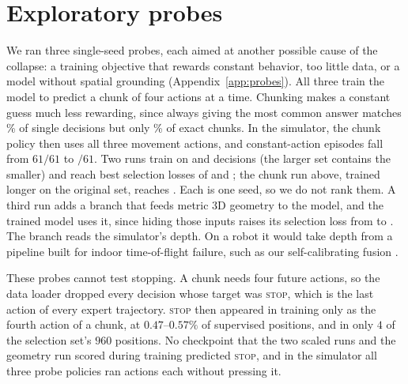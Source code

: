 \section{Exploratory probes}
\label{sec:probes}

We ran three single-seed probes, each aimed at another possible cause of the collapse: a training
objective that rewards constant behavior, too little data, or a model without spatial grounding
(Appendix~\ref{app:probes}). All three train the model to predict a chunk of four actions at a
time. Chunking makes a constant guess much less rewarding, since always giving the most common
answer matches \PrConstSingle\% of single decisions but only \PrConstChunk\% of exact chunks.
In the simulator, the chunk policy then uses all three movement actions, and constant-action
episodes fall from $61/61$ to \PrPilotClConst$/61$. Two runs train on \PrFortyN{} and \PrBigN{}
decisions (the larger set contains the smaller) and reach best selection losses of
\PrFortyMinCE{} and \PrBigMinCE{}; the chunk run above, trained longer on the original set, reaches
\PrPilotMinCE{}. Each is one seed, so we do not rank them. A third run adds a branch that feeds
metric 3D geometry to the model, and the trained model uses it, since hiding those inputs
raises its selection loss from \PrGeoMinCE{} to \PrGeoMasked{}. The branch reads the simulator's
depth. On a robot it would take depth from a pipeline built for indoor time-of-flight failure, such
as our self-calibrating fusion \citep{pushparaju2026selfcalibrating}.

These probes cannot test stopping. A chunk needs four future actions, so the data loader dropped
every decision whose target was \textsc{stop}, which is the last action of every expert trajectory.
\textsc{stop} then appeared in training only as the fourth action of a chunk, at $0.47$--$0.57\%$ of
supervised positions, and in only $4$ of the selection set's $960$ positions. No checkpoint that the
two scaled runs and the geometry run scored during training predicted \textsc{stop}, and in the
simulator all three probe policies ran \PrBigClActs{} actions each without pressing it.
